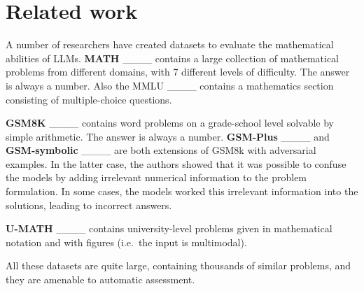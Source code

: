 \section{Related work}
A number of researchers have created datasets to evaluate the mathematical abilities of LLMs. {\bf MATH} ____ contains a large collection of mathematical problems from different domains, with 7 different levels of difficulty. The answer is always a number. Also the MMLU ____ contains a mathematics section consisting of multiple-choice questions.  

{\bf GSM8K} ____ contains word problems on a grade-school level solvable by simple arithmetic. The answer is always a number. {\bf GSM-Plus} ____ and  {\bf GSM-symbolic} ____ are both extensions of GSM8k with adversarial examples. In the latter case, the authors showed that it was possible to confuse the models by adding irrelevant numerical information to the problem formulation. In some cases, the models worked this irrelevant information into the solutions, leading to incorrect answers. 

{\bf U-MATH} ____ contains university-level problems given in mathematical notation and with figures (i.e.\ the input is multimodal). 

All these datasets are quite large, containing thousands of similar problems, and they are amenable to automatic assessment.